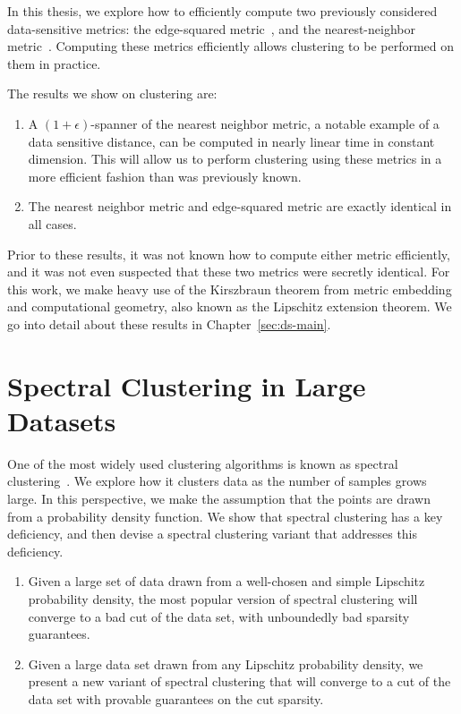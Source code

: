   In this
  thesis, we explore how to efficiently compute two previously
  considered data-sensitive metrics: the edge-squared
  metric~\cite{vincent03}, and
  the nearest-neighbor metric~\cite{cohen15approximating}. Computing
  these metrics efficiently allows clustering to be performed on them in
  practice.

  The results we show on clustering are:
  \begin{enumerate}
  \item A $(1+\epsilon)$-spanner of the nearest neighbor metric, a notable example of a data sensitive
  distance, can be computed in nearly linear time in constant dimension.
  This will allow us to perform clustering using these metrics in a more
  efficient fashion than was previously known.
  \item The nearest neighbor metric and edge-squared metric are exactly
  identical in all cases.
  \end{enumerate}
  Prior to these results, it was not known how to compute either metric
  efficiently, and it was not even suspected that these two metrics were
  secretly identical. For this work, we make heavy use of the Kirszbraun theorem from
  metric embedding and computational geometry, also known as the Lipschitz extension theorem. We go into detail about these results in
  Chapter~\ref{sec:ds-main}.

  \section{Spectral Clustering in Large
    Datasets}\label{sec:spectral-limit}

  One of the most widely used clustering algorithms is known as
  spectral clustering~\cite{NgSpectral01}. We explore how it clusters data as the number of
  samples grows large. In this perspective, we make the assumption that
  the points are drawn from a probability density function. We show that
  spectral clustering has a key deficiency, and then devise a spectral
  clustering variant that addresses this deficiency. 

  \begin{enumerate}
  \item Given a large set of data drawn from a well-chosen and simple Lipschitz probability
  density, the most popular version of spectral clustering will converge
  to a bad cut of the data set, with unboundedly bad sparsity
  guarantees.
  \item Given a large data set drawn from any Lipschitz probability
  density, we present a new variant of spectral clustering that will
  converge to a cut of the data set with provable guarantees on
  the cut sparsity.
  \end{enumerate}
  
